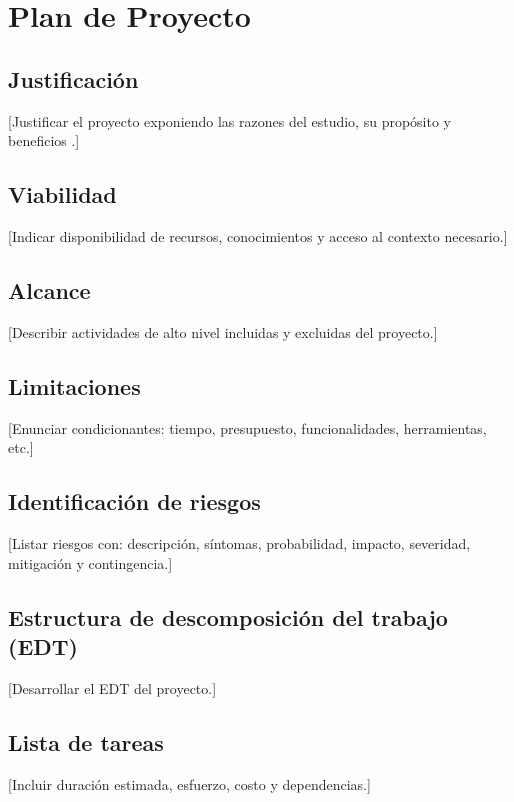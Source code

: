 

\chapter{Plan de Proyecto}
\label{annex:project-plan}

\section*{Justificación}
[Justificar el proyecto exponiendo las razones del estudio,
su propósito y beneficios \cite{a.k.chaudharyEfficientDeepLearning2025}.]

\section*{Viabilidad}
[Indicar disponibilidad de recursos, conocimientos y acceso
al contexto necesario.]

\section*{Alcance}
[Describir actividades de alto nivel incluidas y excluidas
del proyecto.]

\section*{Limitaciones}
[Enunciar condicionantes: tiempo, presupuesto, funcionalidades,
herramientas, etc.]

\section*{Identificación de riesgos}
[Listar riesgos con: descripción, síntomas, probabilidad,
impacto, severidad, mitigación y contingencia.]

\section*{Estructura de descomposición del trabajo (EDT)}
[Desarrollar el EDT del proyecto.]

\section*{Lista de tareas}
[Incluir duración estimada, esfuerzo, costo y dependencias.]

